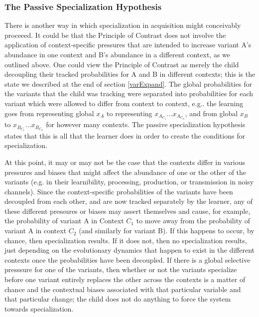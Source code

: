 \subsubsection{The Passive Specialization Hypothesis}

There is another way in which specialization in acquisition might conceivably proceeed.
It could be that the Principle of Contrast does not involve the application of context-specific pressures that are intended to increase variant A's abundance in one context and B's abundance in a different context, as we outlined above.
One could view the Principle of Contrast as merely the child decoupling their tracked probabilities for A and B in different contexts; this is the state we described at the end of section \ref{varExpand}.
The global probabilities for the variants that the child was tracking were separated into probabilities for each variant which were allowed to differ from context to context, e.g.. the learning goes from representing global $x_A$ to representing $x_{A_{C_1}}$...$x_{A_{C_{n}}}$, and from global $x_B$ to $x_{B_{C_1}}$...$x_{B_{C_{n}}}$ for however many contexts.
The passive specialization hypothesis states that this is all that the learner does in order to create the conditions for specialization.

At this point, it may or may not be the case that the contexts differ in various pressures and biases that might affect the abundance of one or the other of the variants (e.g. in their learnibility, processing, production, or transmission in noisy channels).
Since the context-specific probabilities of the variants have been decoupled from each other, and are now tracked separately by the learner, any of these different pressures or biases may assert themselves and cause, for example, the probability of variant A in Context $C_1$ to move away from the probability of variant A in context $C_2$ (and similarly for variant B).
If this happens to occur, by chance, then specialization results.
If it does not, then no specialization results, just depending on the evolutionary dynamics that happen to exist in the different contexts once the probabilities have been decoupled.
If there is a global selective presssure for one of the variants, then whether or not the variants specialize before one variant entirely replaces the other across the contexts is a matter of chance and the contextual biases associated with that particular variable and that particular change; the child does not do anything to force the system towards specialization.

